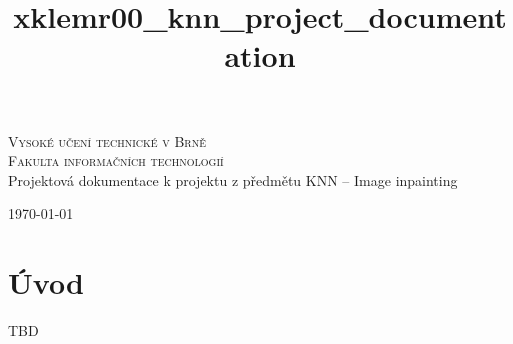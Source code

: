 \documentclass[a4paper, 11pt]{article}
\title{xklemr00\_knn\_project\_documentation}
\begin{document}
    \begin{titlepage}
 \begin{center}
  {\Huge\textsc{Vysoké učení technické v Brně\\[0.3em]
    \huge{Fakulta informačních technologií}}}\\
  {\Huge
  Projektová dokumentace k projektu z předmětu KNN -- Image inpainting}
 \end{center}
 {\Large 
 \today 
 \hfill
}
\end{titlepage}

\newpage
\section{Úvod}
\label{section:uvod}
TBD
\end{document}
